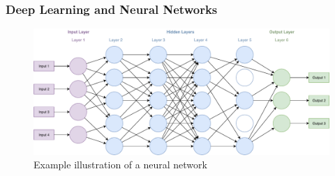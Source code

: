 \documentclass[
	a4paper,
	pagesize,
	pdftex,
	12pt,
	twoside, %
	BCOR=5mm, %
	ngerman,
	fleqn,
	final,
	]{scrartcl}
\begin{document}
\subsubsection{Deep Learning and Neural Networks}\label{Deep-Learning}
\begin{figure}[ht]
	\centering
	\includegraphics[width=\linewidth]{img/NeuralNetwork}
	\caption{Example illustration of a neural network}
	\label{fig:neuralnetwork}
\end{figure}
\end{document}
